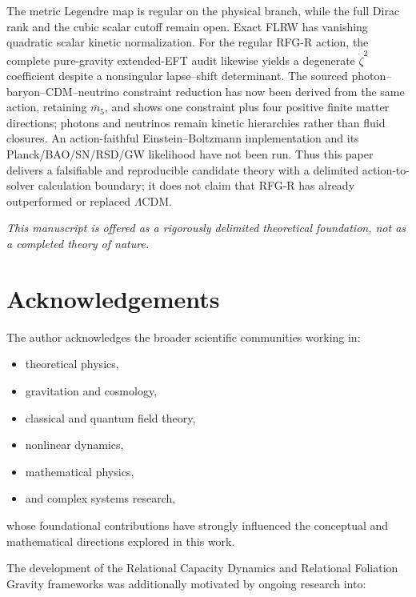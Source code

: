 \documentclass[11pt,a4paper]{article}
\begin{document}
The metric Legendre map is regular on the physical branch, while the full Dirac rank and the cubic scalar cutoff remain open. Exact FLRW has vanishing quadratic scalar kinetic normalization. For the regular RFG-R action, the complete pure-gravity extended-EFT audit likewise yields a degenerate \(\dot\zeta^2\) coefficient despite a nonsingular lapse--shift determinant. The sourced photon--baryon--CDM--neutrino constraint reduction has now been derived from the same action, retaining \(\bar m_5\), and shows one constraint plus four positive finite matter directions; photons and neutrinos remain kinetic hierarchies rather than fluid closures. An action-faithful Einstein--Boltzmann implementation and its Planck/BAO/SN/RSD/GW likelihood have not been run. Thus this paper delivers a falsifiable and reproducible candidate theory with a delimited action-to-solver calculation boundary; it does not claim that RFG-R has already outperformed or replaced \(\Lambda\)CDM.

\vspace{1.2em}
\noindent\textit{This manuscript is offered as a rigorously delimited theoretical foundation, not as a completed theory of nature.}



\section*{Acknowledgements}

The author acknowledges the broader scientific communities working in:

\begin{itemize}
    \item theoretical physics,
    \item gravitation and cosmology,
    \item classical and quantum field theory,
    \item nonlinear dynamics,
    \item mathematical physics,
    \item and complex systems research,
\end{itemize}

whose foundational contributions have strongly influenced the conceptual and
mathematical directions explored in this work.

The development of the Relational Capacity Dynamics and Relational Foliation
Gravity frameworks was additionally motivated by ongoing research into:
\end{document}
